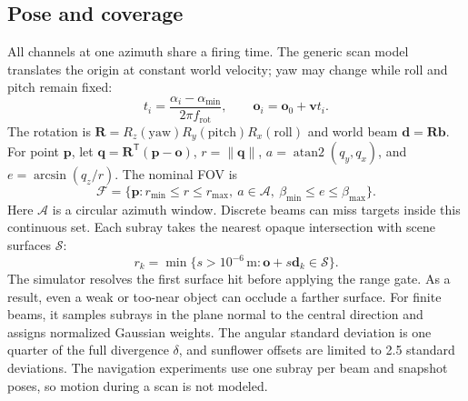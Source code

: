 \documentclass[11pt,letterpaper]{article}
\newcommand{\R}{\mathbf R}
\newcommand{\vect}[1]{\mathbf #1}
\begin{document}
\subsection{Pose and coverage}
All channels at one azimuth share a firing time. The generic scan model translates the origin at constant world velocity; yaw may change while roll and pitch remain fixed:
\begin{equation}\label{eq:time}
t_i=\frac{\alpha_i-\alpha_{\min}}{2\pi f_{\mathrm{rot}}},\qquad \vect o_i=\vect o_0+\vect v t_i.
\end{equation}
The rotation is $\R=R_z(\mathrm{yaw})R_y(\mathrm{pitch})R_x(\mathrm{roll})$ and world beam $\vect d=\R\vect b$. For point $\vect p$, let $\vect q=\R^{\mathsf T}(\vect p-\vect o)$, $r=\|\vect q\|$, $a=\operatorname{atan2}(q_y,q_x)$, and $e=\arcsin(q_z/r)$. The nominal FOV is
\begin{equation}\label{eq:fov}
\mathcal F=\{\vect p:r_{\min}\leq r\leq r_{\max},\ a\in\mathcal A,\ \beta_{\min}\leq e\leq\beta_{\max}\}.
\end{equation}
Here $\mathcal A$ is a circular azimuth window. Discrete beams can miss targets inside this continuous set. Each subray takes the nearest opaque intersection with scene surfaces $\mathcal S$:
\begin{equation}\label{eq:los}
r_k=\min\{s>10^{-6}\,\mathrm m:\vect o+s\vect d_k\in\mathcal S\}.
\end{equation}
The simulator resolves the first surface hit before applying the range gate. As a result, even a weak or too-near object can occlude a farther surface. For finite beams, it samples subrays in the plane normal to the central direction and assigns normalized Gaussian weights. The angular standard deviation is one quarter of the full divergence $\delta$, and sunflower offsets are limited to 2.5 standard deviations. The navigation experiments use one subray per beam and snapshot poses, so motion during a scan is not modeled.
\end{document}
